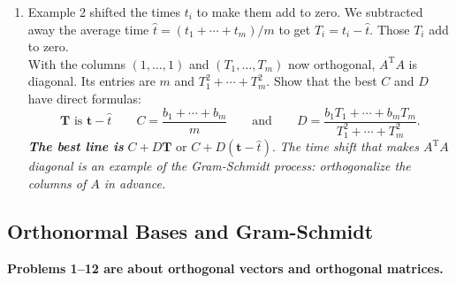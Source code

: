 \documentclass[14pt, a4paper]{article}
\begin{document}
\begin{enumerate}[resume]
    \item Example 2 shifted the times $t_i$ to make them add to zero. We subtracted away the average time $\widehat{t} = (t_1 + \cdots + t_m)/m$ to get $T_i = t_i - \widehat{t}$. Those $T_i$ add to zero. \\
          With the columns $(1, \dots, 1)$ and $(T_1, \dots, T_m)$ now orthogonal, $A^{\mathrm{T}}A$ is diagonal. Its entries are $m$ and $T_1^2 + \cdots + T_m^2$. Show that the best $C$ and $D$ have direct formulas:
          \[
              \boldsymbol{T} \text{ is } \boldsymbol{t} - \widehat{t} \qquad C = \frac{b_1 + \cdots + b_m}{m} \qquad \text{and} \qquad D = \frac{b_1 T_1 + \cdots + b_m T_m}{T_1^2 + \cdots + T_m^2}.
          \]
          \textbf{\emph{The best line is }} $C + D\boldsymbol{T} \text{ or } C + D(\boldsymbol{t} - \widehat{t})$. \emph{The time shift that makes $A^{\mathrm{T}}A$ diagonal is an example of the Gram-Schmidt process: orthogonalize the columns of $A$ in advance.}
\end{enumerate}



\subsection{Orthonormal Bases and Gram-Schmidt}

\noindent \textbf{Problems 1--12 are about orthogonal vectors and orthogonal matrices.}
\end{document}
